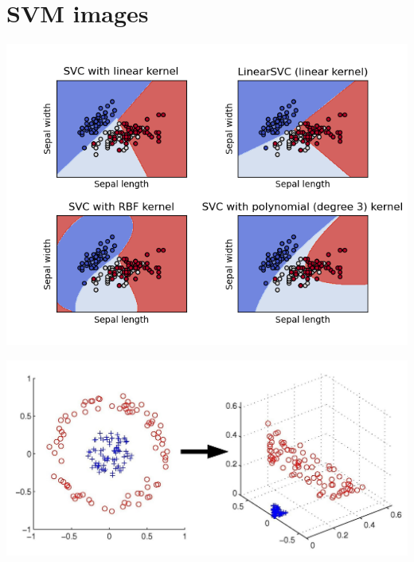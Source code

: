 \documentclass[10pt,a4paper]{report}
\theoremstyle{myn}
\theoremstyle{myu}
\begin{document}
\clearpage


\section{SVM images}

\begin{center}
\includegraphics[width=0.9\linewidth, right]{img/img1.png}
\end{center}

\begin{center}
\includegraphics[width=0.9\linewidth, right]{img/img2.jpeg}
\end{center}
\end{document}
